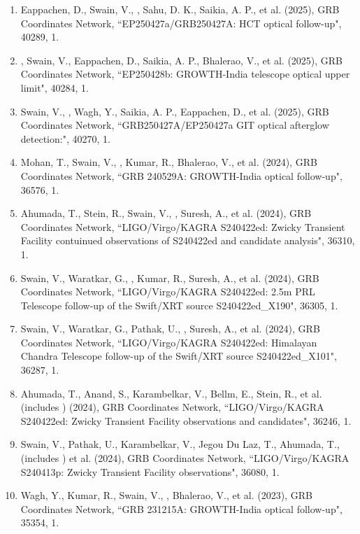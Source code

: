 \begin{enumerate}
\item Eappachen, D., Swain, V., \me, Sahu, D. K., Saikia, A. P., et al. (2025), GRB Coordinates Network, {``EP250427a/GRB250427A: HCT optical follow-up"}, 40289, 1.

\item \me, Swain, V., Eappachen, D., Saikia, A. P., Bhalerao, V., et al. (2025), GRB Coordinates Network, {``EP250428b: GROWTH-India telescope optical upper limit"}, 40284, 1.

\item Swain, V., \me, Wagh, Y., Saikia, A. P., Eappachen, D., et al. (2025), GRB Coordinates Network, {``GRB250427A/EP250427a GIT optical afterglow detection:"}, 40270, 1.

\item Mohan, T., Swain, V., \me, Kumar, R., Bhalerao, V., et al. (2024), GRB Coordinates Network, {``GRB 240529A: GROWTH-India optical follow-up"}, 36576, 1.

\item Ahumada, T., Stein, R., Swain, V., \me, Suresh, A., et al. (2024), GRB Coordinates Network, {``LIGO/Virgo/KAGRA S240422ed: Zwicky Transient Facility contuinued observations of S240422ed and candidate analysis"}, 36310, 1.

\item Swain, V., Waratkar, G., \me, Kumar, R., Suresh, A., et al. (2024), GRB Coordinates Network, {``LIGO/Virgo/KAGRA S240422ed: 2.5m PRL Telescope follow-up of the Swift/XRT source S240422ed\_X190"}, 36305, 1.

\item Swain, V., Waratkar, G., Pathak, U., \me, Suresh, A., et al. (2024), GRB Coordinates Network, {``LIGO/Virgo/KAGRA S240422ed: Himalayan Chandra Telescope follow-up of the Swift/XRT source S240422ed\_X101"}, 36287, 1.

\item Ahumada, T., Anand, S., Karambelkar, V., Bellm, E., Stein, R., et al. (includes \me) (2024), GRB Coordinates Network, {``LIGO/Virgo/KAGRA S240422ed: Zwicky Transient Facility observations and candidates"}, 36246, 1.

\item Swain, V., Pathak, U., Karambelkar, V., Jegou Du Laz, T., Ahumada, T., (includes \me) et al. (2024), GRB Coordinates Network, {``LIGO/Virgo/KAGRA S240413p: Zwicky Transient Facility observations"}, 36080, 1.

\item Wagh, Y., Kumar, R., Swain, V., \me, Bhalerao, V., et al. (2023), GRB Coordinates Network, {``GRB 231215A: GROWTH-India optical follow-up"}, 35354, 1.


\end{enumerate}
